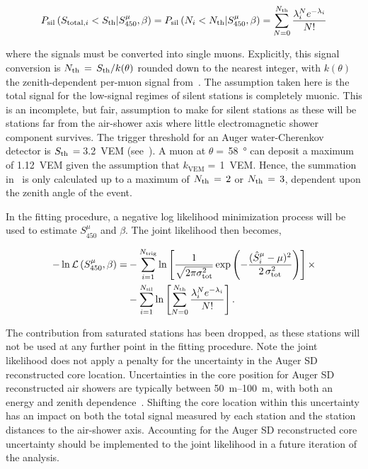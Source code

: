 \begin{equation}
  P_{\rm sil}\left(S_{\text{total}, i} < S_{\rm th}| S^{\mu}_{450}, \beta\right) = P_{\rm sil}\left(N_{i} < N_{\rm th}| S^{\mu}_{450}, \beta\right) = \sum_{N = 0}^{N_{\rm th}} \frac{\lambda_{i}^{N}e^{-\lambda_{i}}}{N!} \label{eq:silent}
\end{equation}

\noindent
where the signals must be converted into single muons.
Explicitly, this signal conversion is $N_{\rm th}\,=\,S_{\rm th} / k(\theta)$ rounded down to the nearest integer, with $k(\theta)$ the zenith-dependent per-muon signal from~.
The assumption taken here is the total signal for the low-signal regimes of silent stations is completely muonic.
This is an incomplete, but fair, assumption to make for silent stations as these will be stations far from the air-shower axis where little electromagnetic shower component survives.
The trigger threshold for an Auger water-Cherenkov detector is $S_{\rm th}\,=\,$\qty{3.2}{VEM} (see~).
A muon at $\theta=$\,\qty{58}{\degree} can deposit a maximum of \qty{1.12}{VEM} given the assumption that $k_{\text{VEM}}=$\,\qty{1}{VEM}.
Hence, the summation in~ is only calculated up to a maximum of $N_{\rm th}\,=\,2$ or $N_{\rm th}\,=\,3$, dependent upon the zenith angle of the event.

In the fitting procedure, a negative log likelihood minimization process will be used to estimate $S^{\mu}_{450}$ and $\beta$.
The joint likelihood then becomes,

\begin{align}
  -\ln\mathcal{L}\left(S^{\mu}_{450}, \beta\right) = & -\sum_{i = 1}^{N_{\rm trig}} \ln\left[\frac{1}{\sqrt{2\pi\sigma_{\rm tot}^{2}}}\exp\left( - \frac{(\hat{S}^{\mu}_{i} - \mu)^{2}}{2\,\sigma_{\rm tot}^{2}}\right)\right] \times \nonumber\\
   & -\sum_{i = 1}^{N_{\rm sil}} \ln\left[\sum_{N = 0}^{N_{\rm th}} \frac{\lambda_{i}^{N}e^{-\lambda_{i}}}{N!}\right]. \label{eq:joint_nll}
\end{align}

\noindent
The contribution from saturated stations has been dropped, as these stations will not be used at any further point in the fitting procedure.
Note the joint likelihood does not apply a penalty for the uncertainty in the Auger SD reconstructed core location.
Uncertainties in the core position for Auger SD reconstructed air showers are typically between \qtyrange{50}{100}{\meter}, with both an energy and zenith dependence~\cite{auger_jinst2020_sdreconstruction}.
Shifting the core location within this uncertainty has an impact on both the total signal measured by each station and the station distances to the air-shower axis.
Accounting for the Auger SD reconstructed core uncertainty should be implemented to the joint likelihood in a future iteration of the analysis.

